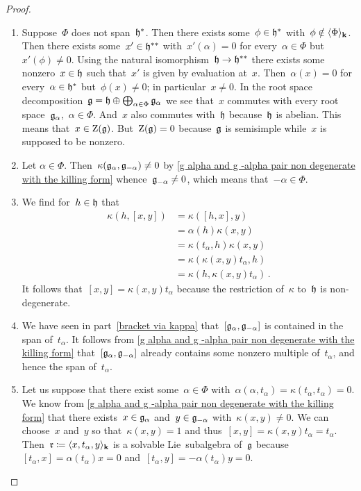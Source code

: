 \begin{proof}
  \leavevmode
  \begin{enumerate}
    \item
      Suppose~$\Phi$ does not span~$\mathfrak{h}^*$.
      Then there exists some~$\phi \in \mathfrak{h}^*$ with~$\phi \notin \langle\Phi\rangle_{\mathbf{k}}$.
      Then there exists some~$x' \in \mathfrak{h}^{**}$ with~$x'(\alpha) = 0$ for every~$\alpha \in \Phi$ but~$x'(\phi) \neq 0$.
      Using the natural isomorphism~$\mathfrak{h} \to \mathfrak{h}^{**}$ there exists some nonzero~$x \in \mathfrak{h}$ such that~$x'$ is given by evaluation at~$x$.
      Then~$\alpha(x) = 0$ for every~$\alpha \in \mathfrak{h}^*$ but~$\phi(x) \neq 0$;
      in particular~$x \neq 0$.
      In the root space decomposition~$\mathfrak{g} = \mathfrak{h} \oplus \bigoplus_{\alpha \in \Phi} \mathfrak{g}_\alpha$ we see that~$x$ commutes with every root space~$\mathfrak{g}_\alpha$,~$\alpha \in \Phi$.
      And~$x$ also commutes with~$\mathfrak{h}$ because~$\mathfrak{h}$ is abelian.
      This means that~$x \in \operatorname{Z}(\mathfrak{g})$.
      But~$\operatorname{Z}(\mathfrak{g}) = 0$ because~$\mathfrak{g}$ is semisimple while~$x$ is supposed to be nonzero.
    \item
      Let $\alpha \in \Phi$.
      Then~$\kappa(\mathfrak{g}_\alpha, \mathfrak{g}_{-\alpha}) \neq 0$ by \cref{g alpha and g -alpha pair non degenerate with the killing form} whence~$\mathfrak{g}_{-\alpha} \neq 0$, which means that~$-\alpha \in \Phi$.
    \item
      We find for~$h \in \mathfrak{h}$ that
      \begin{align*}
        \kappa(h, [x,y])
        &=
        \kappa([h,x], y)
        \\
        &= 
        \alpha(h) \kappa(x,y)
        \\
        &=
        \kappa(t_\alpha, h) \kappa(x,y)
        \\
        &=
        \kappa(\kappa(x,y) t_\alpha, h)
        \\
        &=
        \kappa(h, \kappa(x,y) t_\alpha) \,.
      \end{align*}
      It follows that~$[x,y] = \kappa(x,y) t_\alpha$ because the restriction of~$\kappa$ to~$\mathfrak{h}$ is non-degenerate.
    \item
      We have seen in part~\ref*{bracket via kappa} that~$[\mathfrak{g}_\alpha, \mathfrak{g}_{-\alpha}]$ is contained in the span of~$t_\alpha$.
      It follows from \cref{g alpha and g -alpha pair non degenerate with the killing form} that~$[\mathfrak{g}_\alpha, \mathfrak{g}_{-\alpha}]$ already contains some nonzero multiple of~$t_\alpha$, and hence the span of~$t_\alpha$.
    \item
      Let us suppose that there exist some~$\alpha \in \Phi$ with~$\alpha(\alpha, t_\alpha) = \kappa(t_\alpha, t_\alpha) = 0$.
      We know from \cref{g alpha and g -alpha pair non degenerate with the killing form} that there exists~$x \in \mathfrak{g}_\alpha$ and~$y \in \mathfrak{g}_{-\alpha}$ with~$\kappa(x,y) \neq 0$.
      We can choose~$x$ and~$y$ so that~$\kappa(x,y) = 1$ and thus~$[x,y] = \kappa(x,y) t_\alpha = t_\alpha$.
      Then~$\mathfrak{r} \coloneqq \langle x, t_\alpha, y\rangle_{\mathbf{k}}$ is a {\threedimensional} solvable Lie~subalgebra of~$\mathfrak{g}$ because~$[t_\alpha, x] = \alpha(t_\alpha) x = 0$ and~$[t_\alpha, y] = -\alpha(t_\alpha) y = 0$.
      

\end{enumerate}
\end{proof}
